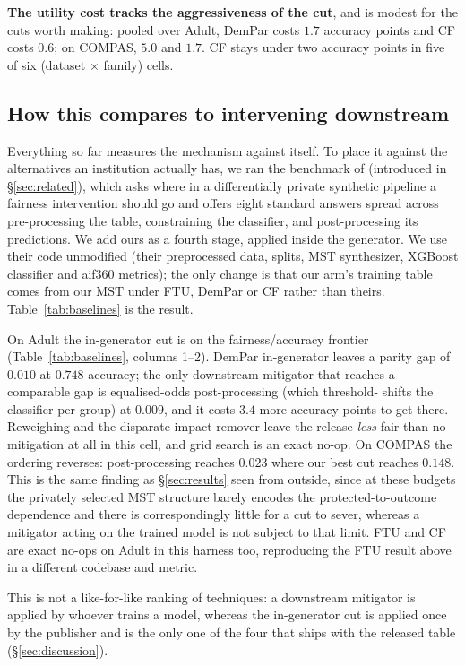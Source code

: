 \documentclass{article}
\begin{document}
\textbf{The utility cost tracks the aggressiveness of the cut}, and is modest
for the cuts worth making: pooled over Adult, DemPar costs $1.7$ accuracy
points and CF costs $0.6$; on COMPAS, $5.0$ and $1.7$. CF stays under two
accuracy points in five of six (dataset $\times$ family) cells.

\subsection{How this compares to intervening downstream}



Everything so far measures the mechanism against itself. To place it against
the alternatives an institution actually has, we ran the benchmark of
\citet{angelozzi2026where} (introduced in \S\ref{sec:related}), which asks
where in a differentially private synthetic pipeline a fairness intervention
should go and offers eight standard answers spread across pre-processing the
table, constraining the classifier, and post-processing its predictions. We
add ours as a fourth stage, applied inside the generator. We use their code
unmodified (their preprocessed data, splits, MST synthesizer, XGBoost
classifier and aif360 metrics); the only change is that our arm's training
table comes from our MST under FTU, DemPar or CF rather than theirs.
Table~\ref{tab:baselines} is the result.

On Adult the in-generator cut is on the fairness/accuracy frontier
(Table~\ref{tab:baselines}, columns 1--2). DemPar in-generator leaves a
parity gap of $0.010$ at $0.748$ accuracy; the only downstream mitigator that
reaches a comparable gap is equalised-odds post-processing (which threshold-
shifts the classifier per group) at $0.009$, and it costs $3.4$ more accuracy
points to get there. Reweighing and the disparate-impact remover leave the
release \emph{less} fair than no mitigation at all in this cell, and grid
search is an exact no-op. On COMPAS the ordering reverses: post-processing
reaches $0.023$ where our best cut reaches $0.148$. This is the same finding
as \S\ref{sec:results} seen from outside, since at these budgets the
privately selected MST structure barely encodes the protected-to-outcome
dependence and there is correspondingly little for a cut to sever, whereas a
mitigator acting on the trained model is not subject to that limit. FTU and
CF are exact no-ops on Adult in this harness too, reproducing the FTU result
above in a different codebase and metric.

This is not a like-for-like ranking of techniques: a downstream mitigator is
applied by whoever trains a model, whereas the in-generator cut is applied once
by the publisher and is the only one of the four that ships with the released
table (\S\ref{sec:discussion}).
\end{document}

